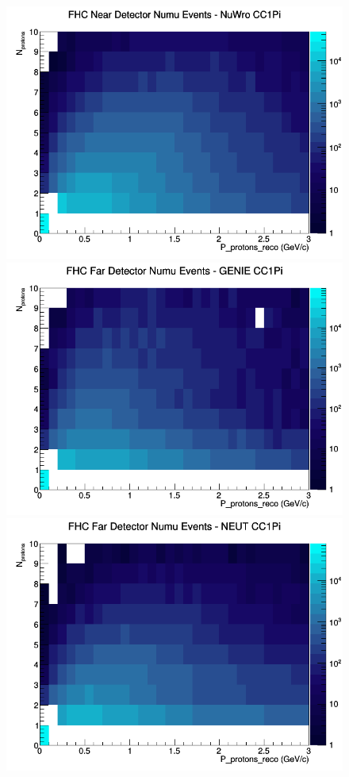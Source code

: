\begin{figure}[h]
\includegraphics[width=\linewidth]{eff_N_P/LAr/protons/CC1Pi_FHC_ND_numu_N_P_NuWro.png}
\endminipage
\newline
{}
\includegraphics[width=\linewidth]{eff_N_P/LAr/protons/CC1Pi_FHC_FD_numu_N_P_GENIE.png}
\endminipage
{}
\includegraphics[width=\linewidth]{eff_N_P/LAr/protons/CC1Pi_FHC_FD_numu_N_P_NEUT.png}

\end{figure}
